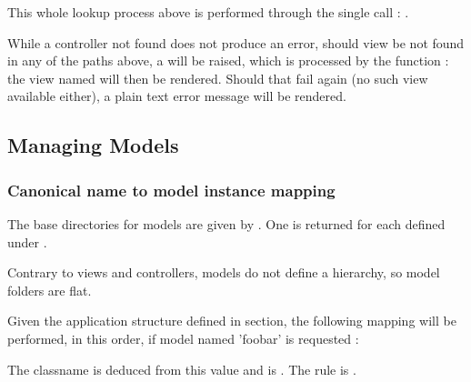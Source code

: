 \documentclass[pdftex,12pt,a4paper]{article}
\begin{document}
This whole lookup process above is performed through the single call : .
\begin{note}
While a controller not found does not produce an error, should view  be not found in any of the paths above,
a  will be raised, which is processed by the function  : the view named  will then be rendered. Should that fail again (\eg no such view available either), a plain text error message will be rendered.
\end{note}


\subsection{Managing Models} \label{sec:managing-models}

\subsubsection{Canonical name to model instance mapping} \label{sec:canonical-name-to-model-instance-mapping}

The base directories for models are given by . One is returned for each defined  under .

Contrary to views and controllers, models do not define a hierarchy, so model folders are flat.

Given the application structure defined in  section, the following mapping will be performed, in this order, if model named 'foobar' is requested :

The  classname is deduced from this value and is . The rule is
.
\end{document}
